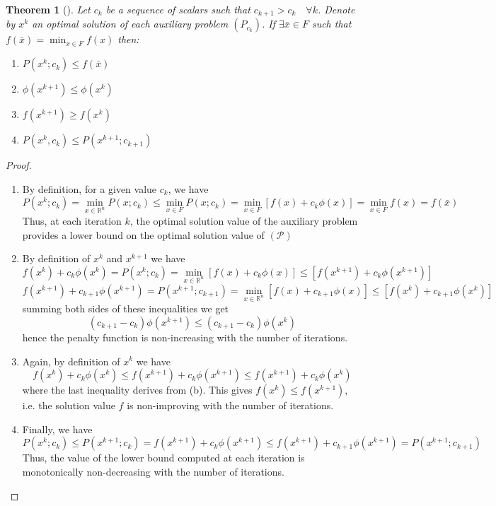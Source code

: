 \documentclass{book}
\newcommand{\R}{\mathbb{R}}
\theoremstyle{theoremv2}
\newtheorem{theorem}{Theorem}[chapter]
\theoremstyle{defv2}
\theoremstyle{remark}
\theoremstyle{remark}
\begin{document}
\begin{theorem}[]
    Let $c_k$ be a sequence of scalars such that $c_{k+1}>c_k \quad \forall k$. Denote by $x^k$ an optimal solution of each auxiliary problem $(P_{c_k})$. If $\exists \bar{x}\in F$ such that $f(\bar{x})=\min_{x\in F}f(x)$ then:
    \begin{enumerate}[label=(\alph*)]
        \item $ P(x^k;c_k)\leq f(\bar{x}) $
        \item $ \phi(x^{k+1})\leq \phi(x^k) $
        \item $ f(x^{k+1}) \geq f(x^k) $
        \item $ P(x^k,c_k)\leq P(x^{k+1};c_{k+1}) $
    \end{enumerate}
\end{theorem}
\begin{proof}
    \begin{enumerate}[label=(\alph*)]
        \item By definition, for a given value $c_k$, we have 
            \[
                P(x^k;c_k)=\min_{x\in\R^n}P(x;c_k)\leq\min_{x\in F}P(x;c_k)= \min_{x\in F}[f(x)+c_k\phi(x)] =\min_{x\in F}f(x)=f(\bar{x})
            \]
            Thus, at each iteration $k$, the optimal solution value of the auxiliary problem provides a lower bound on the optimal solution value of $(\mathcal{P})$
        \item By definition of $x^k$ and $x^{k+1}$ we have 
            \[
                f(x^k)+c_k\phi(x^k)=P(x^k;c_k)=\min_{x\in\R^n}[f(x)+c_k\phi(x)]\leq[f(x^{k+1})+c_k\phi(x^{k+1})]
            \]
            \[
                f(x^{k+1})+c_{k+1}\phi(x^{k+1}) = P(x^{k+1};c_{k+1})=\min_{x\in\R^n}[f(x)+c_{k+1}\phi(x)]\leq[f(x^k)+c_{k+1}\phi(x^k)]
            \]
            summing both sides of these inequalities we get 
            \[
                (c_{k+1}-c_k)\phi(x^{k+1})\leq (c_{k+1}-c_k)\phi(x^k)
            \]
            hence the penalty function is non-increasing with the number of iterations.
        \item Again, by definition of $x^k$ we have 
            \[
                f(x^k)+c_k\phi(x^k)\leq f(x^{k+1})+c_k\phi(x^{k+1})\leq f(x^{k+1})+c_k\phi(x^k)
            \]
            where the last inequality derives from (b). This gives $f(x^k)\leq f(x^{k+1})$, i.e. the solution value $f$ is non-improving with the number of iterations.
        \item Finally, we have 
            \[
                P(x^k;c_k)\leq P(x^{k+1};c_k)=f(x^{k+1})+c_k\phi(x^{k+1})\leq f(x^{k+1})+c_{k+1}\phi(x^{k+1})=P(x^{k+1};c_{k+1})
            \]
            Thus, the value of the lower bound computed at each iteration is monotonically non-decreasing with the number of iterations.
    \end{enumerate}
\end{proof}
\end{document}
